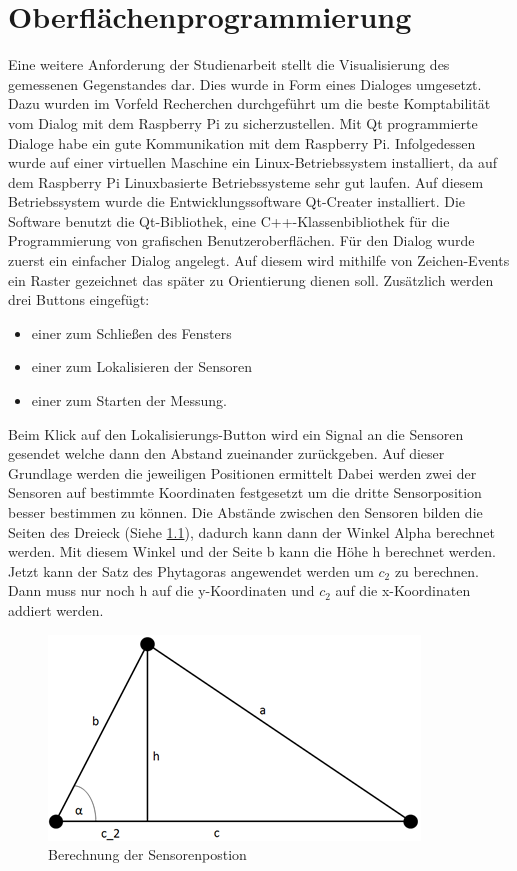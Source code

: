 

\chapter{Oberflächenprogrammierung}
Eine weitere Anforderung der Studienarbeit stellt die Visualisierung des gemessenen Gegenstandes dar. Dies wurde in Form eines Dialoges umgesetzt. Dazu wurden im Vorfeld Recherchen durchgeführt um die beste Komptabilität vom Dialog mit dem Raspberry Pi zu sicherzustellen. Mit Qt programmierte Dialoge habe ein gute Kommunikation mit dem Raspberry Pi. Infolgedessen wurde auf einer virtuellen Maschine ein Linux-Betriebssystem installiert, da auf dem Raspberry Pi Linuxbasierte Betriebssysteme sehr gut laufen. Auf diesem Betriebssystem wurde die Entwicklungssoftware Qt-Creater installiert. Die Software benutzt die Qt-Bibliothek, eine C++-Klassenbibliothek für die Programmierung von grafischen Benutzeroberflächen. 
Für den Dialog wurde zuerst ein einfacher Dialog angelegt. Auf diesem wird mithilfe von Zeichen-Events ein Raster gezeichnet das später zu Orientierung dienen soll. Zusätzlich werden drei Buttons eingefügt:
\begin{itemize}
	\item einer zum Schließen des Fensters
	\item einer zum Lokalisieren der Sensoren
	\item einer zum Starten der Messung.
\end{itemize}
Beim Klick auf den Lokalisierungs-Button wird ein Signal an die Sensoren gesendet welche dann den Abstand zueinander zurückgeben. Auf dieser Grundlage werden die jeweiligen Positionen ermittelt Dabei werden zwei der Sensoren auf bestimmte Koordinaten festgesetzt um die dritte Sensorposition besser bestimmen zu können. Die Abstände zwischen den Sensoren bilden die Seiten des Dreieck (Siehe \ref{img:gui1}), dadurch kann dann der Winkel Alpha berechnet werden. Mit diesem Winkel und der Seite b kann die Höhe h berechnet werden. Jetzt kann der Satz des Phytagoras angewendet werden um $c_2$ zu berechnen. Dann muss nur noch h auf die y-Koordinaten und $c_2$ auf die x-Koordinaten addiert werden.
\begin{figure}
	\centering
	\includegraphics[scale=1]{images/gui/01.png}
	\caption{Berechnung der Sensorenpostion} \label{img:gui1}
\end{figure}

